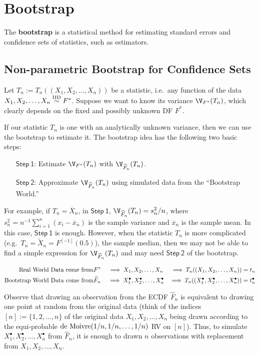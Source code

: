 \section{Bootstrap}
The {\bf bootstrap} is a statistical method for estimating standard errors and confidence sets of statistics, such as estimators.

\subsection{Non-parametric Bootstrap for Confidence Sets}\label{S:NPBootstrap}
Let $T_n := T_n((X_1,X_2,\ldots,X_n))$ be a statistic, i.e.~any function of the data $X_1,X_2,\ldots,X_n \overset{{\rm IID}}{\sim} F^*$.  Suppose we want to know its variance $\V_{F^*}(T_n)$, which clearly depends on the fixed and possibly unknown DF $F^*$.  

If our statistic $T_n$ is one with an analytically unknown variance, then we can use the bootstrap to estimate it.  The bootstrap idea has the following two basic steps:
\begin{enumerate}
\item[$\mathsf{Step~1}$:] Estimate $\V_{F^*}(T_n)$ with $\V_{\widehat{F}_n}(T_n)$.
\item[$\mathsf{Step~2}$:] Approximate $\V_{\widehat{F}_n}(T_n)$ using simulated data from the ``Bootstrap World.'' 
\end{enumerate}
For example, if $T_n=\overline{X}_n$, in $\mathsf{Step~1}$, $\V_{\widehat{F}_n}(T_n) = s_n^2/n$, where $s_n^2=n^{-1} \sum_{i=1}^n (x_i-\overline{x}_n)$ is the sample variance and $\overline{x}_n$ is the sample mean.  In this case,  $\mathsf{Step~1}$ is enough.  However, when the statistic $T_n$ is more complicated (e.g.~$T_n=\widetilde{X}_n = F^{[-1]}(0.5)$), the sample median, then we may not be able to find a simple expression for $\V_{\widehat{F}_n}(T_n)$ and may need $\mathsf{Step~2}$ of the bootstrap.

\begin{eqnarray}
\text{Real World Data come from} &  F^* \quad \implies X_1,X_2,\ldots,X_n & \implies 
T_n((X_1,X_2,\ldots,X_n))=t_n \notag \\
\text{Bootstrap World Data come from} & \widehat{F}_n \quad  \implies X^{\bullet}_1,X^{\bullet}_2,\ldots,X^{\bullet}_n & \implies 
T_n((X^{\bullet}_1,X^{\bullet}_2,\ldots,X^{\bullet}_n))=t^{\bullet}_n \notag
\end{eqnarray}

Observe that drawing an observation from the ECDF $\widehat{F}_n$ is equivalent to drawing one point at random from the original data (think of the indices $[n] := \{ 1,2,\ldots,n \}$ of the original data $X_1,X_2,\ldots,X_n$ being drawn according to the equi-probable $\mbox{{\rm de~Moivre}}(1/n,1/n,\ldots,1/n)$ RV on $[n]$).  Thus, to simulate $X^{\bullet}_1,X^{\bullet}_2,\ldots,X^{\bullet}_n$ from $\widehat{F}_n$, it is enough to drawn $n$ observations with replacement from $X_1,X_2,\ldots,X_n$.

